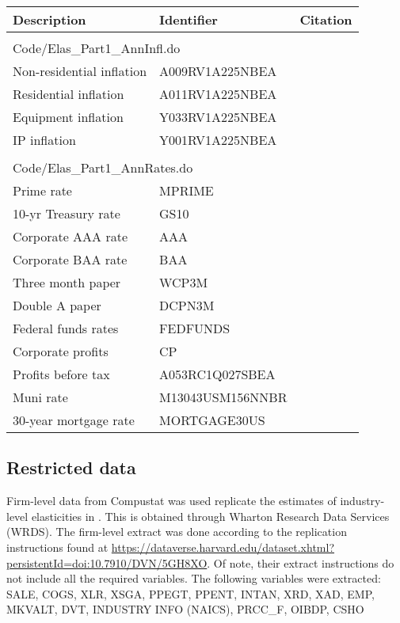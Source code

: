 \documentclass[11pt]{article}
\begin{document}
\begin{longtable}{p{2in}p{1.5in}p{2.5in}}
Description & Identifier & Citation \\
\midrule
\\
\multicolumn{3}{l}{Code/Elas\_Part1\_AnnInfl.do} \\ \midrule
Non-residential inflation & A009RV1A225NBEA &  \cite{fedint}\\
Residential inflation & A011RV1A225NBEA & \cite{fedint}\\
Equipment inflation & Y033RV1A225NBEA  &  \cite{fedint}\\
IP inflation & Y001RV1A225NBEA  &  \cite{fedint} \\
\\
\multicolumn{3}{l}{Code/Elas\_Part1\_AnnRates.do} \\ \midrule
Prime rate & MPRIME &  \cite{fedint}\\
10-yr Treasury rate & GS10 & \cite{fedint}\\
Corporate AAA rate & AAA  &  \cite{moodys}\\
Corporate BAA rate & BAA  &  \cite{moodys} \\
Three month paper & WCP3M  &  \cite{moodys} \\
Double A paper & DCPN3M  &  \cite{moodys} \\
Federal funds rates & FEDFUNDS  &  \cite{fedint} \\
Corporate profits &  CP & \cite{beaimap} \\
Profits before tax &  A053RC1Q027SBEA & \cite{beaimap} \\
Muni rate &  M13043USM156NNBR & \cite{moodys} \\
30-year mortgage rate &  MORTGAGE30US & \cite{moodys} \\
\end{longtable}

\subsection{Restricted data}
Firm-level data from Compustat was used replicate the estimates of industry-level elasticities in \cite{dleu2020}. This is obtained through Wharton Research Data Services (WRDS). The firm-level extract was done according to the replication instructions found at \url{https://dataverse.harvard.edu/dataset.xhtml?persistentId=doi:10.7910/DVN/5GH8XO}. Of note, their extract instructions do not include all the required variables. The following variables were extracted: SALE, COGS, XLR, XSGA, PPEGT, PPENT, INTAN, XRD, XAD, EMP, MKVALT, DVT, INDUSTRY INFO (NAICS), PRCC\_F, OIBDP, CSHO
\end{document}
